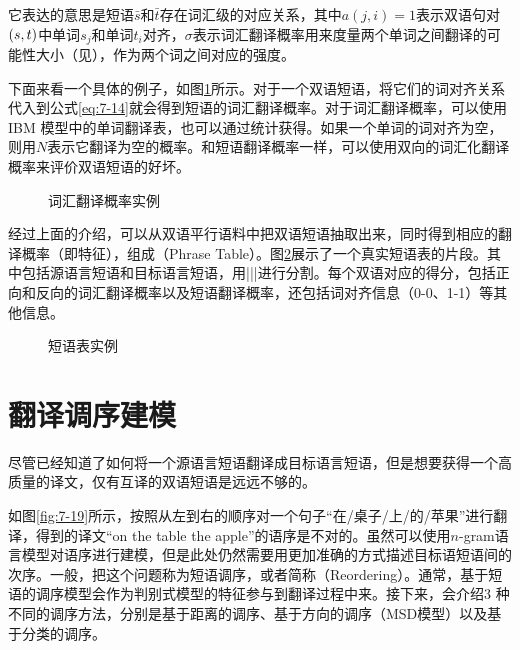 \parinterval 它表达的意思是短语$\bar{s}$和$\bar{t}$存在词汇级的对应关系，其中$a(j,i)=1$表示双语句对$({s},{t})$中单词$s_j$和单词$t_i$对齐，$\sigma $表示词汇翻译概率用来度量两个单词之间翻译的可能性大小（见{\chapterfive}），作为两个词之间对应的强度。

\parinterval 下面来看一个具体的例子，如图\ref{fig:7-17}所示。对于一个双语短语，将它们的词对齐关系代入到公式\eqref{eq:7-14}就会得到短语的词汇翻译概率。对于词汇翻译概率，可以使用IBM 模型中的单词翻译表，也可以通过统计获得。如果一个单词的词对齐为空，则用$N$表示它翻译为空的概率。和短语翻译概率一样，可以使用双向的词汇化翻译概率来评价双语短语的好坏。

\begin{figure}[htp]
\centering

\caption{词汇翻译概率实例}
\label{fig:7-17}
\end{figure}

\parinterval 经过上面的介绍，可以从双语平行语料中把双语短语抽取出来，同时得到相应的翻译概率（即特征），组成{\small{}}（Phrase Table）。图\ref{fig:7-18}展示了一个真实短语表的片段。其中包括源语言短语和目标语言短语，用|||进行分割。每个双语对应的得分，包括正向和反向的词汇翻译概率以及短语翻译概率，还包括词对齐信息（0-0、1-1）等其他信息。

\begin{figure}[htp]
\centering

\caption{短语表实例}
\label{fig:7-18}
\end{figure}

\sectionnewpage
\section{翻译调序建模}\label{subsection-7.4}

\parinterval 尽管已经知道了如何将一个源语言短语翻译成目标语言短语，但是想要获得一个高质量的译文，仅有互译的双语短语是远远不够的。

\parinterval 如图\ref{fig:7-19}所示，按照从左到右的顺序对一个句子“在/桌子/上/的/苹果”进行翻译，得到的译文“on the table the apple”的语序是不对的。虽然可以使用$n$-gram语言模型对语序进行建模，但是此处仍然需要用更加准确的方式描述目标语短语间的次序。一般，把这个问题称为短语调序，或者简称{\small{}}（Reordering）。通常，基于短语的调序模型会作为判别式模型的特征参与到翻译过程中来。接下来，会介绍3 种不同的调序方法，分别是基于距离的调序、基于方向的调序（MSD模型）以及基于分类的调序。

